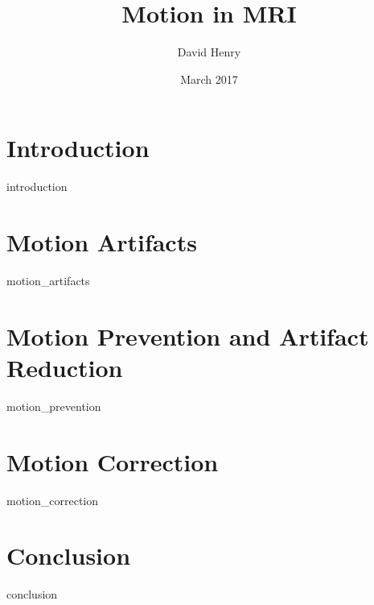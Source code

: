 \documentclass{article}
\title{Motion in MRI}
\author{David Henry}
\date{March 2017}
\begin{document}
\maketitle

\tableofcontents

\section{Introduction} \label{Section1}
{introduction}

\section{Motion Artifacts} \label{Section2}
{motion_artifacts}

\section{Motion Prevention and Artifact Reduction} \label{Section3}
{motion_prevention}

\section{Motion Correction} \label{Section4}
{motion_correction}

\section{Conclusion} \label{Section5}
{conclusion}

\printbibliography
\end{document}
